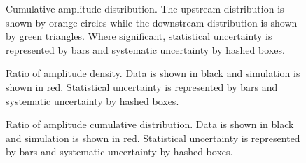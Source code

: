 \begin{figure}[!tbh]
    \centering
    {Cumulative amplitude distribution. The upstream distribution is shown by orange
    circles while the downstream distribution is shown by green triangles. Where
    significant, statistical uncertainty is represented by bars and systematic 
    uncertainty by hashed boxes.}
\end{figure}

\begin{figure}[!tbh]
    \centering
    {Ratio of amplitude density. Data is shown in black and simulation is shown in
     red. Statistical uncertainty is represented by bars and systematic 
     uncertainty by hashed boxes.}
\end{figure}

\begin{figure}[!tbh]
    \centering
    {Ratio of amplitude cumulative distribution. Data is shown in black and 
     simulation is shown in red. Statistical uncertainty is represented by bars 
     and systematic uncertainty by hashed boxes.}
\end{figure}
